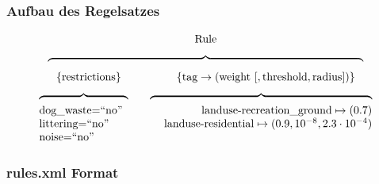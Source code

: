 \begin{frame}[fragile]
 \frametitle{Aufbau des Regelsatzes}
 \[
  \begin{array}{c}
  \text{Rule} \\[6pt]
  \overbrace{\hspace{284pt}}\\[4pt]
    \{ \text{restrictions} \}
    \hspace{50pt}
    \{ \text{tag} \to (\text{weight}~[,\text{threshold},\text{radius}]) \} \\[6pt]
    \begin{array}{l r}
      \overbrace{ \hspace{80pt} } \hspace{10pt} & \overbrace{ \hspace{200pt} }\\
      \text{dog\_waste=``no''} & \text{landuse-recreation\_ground} \mapsto (0.7) \\
      \text{littering=``no''} & \text{landuse-residential} \mapsto (0.9,10^{-8},2.3\cdot 10^{-4}) \\
      \text{noise=``no''} &
    \end{array}
  \end{array}
 \]
\end{frame}

\begin{frame}[fragile]
  \frametitle{rules.xml Format}
  \lstset{language=XML,basicstyle=\scriptsize}
  
\end{frame}
